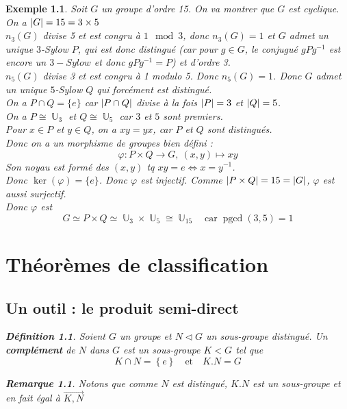 \documentclass[a4paper, oneside]{report}
\theoremstyle{break}
\newtheorem{definition}[thm]{Définition}
\newtheorem{exemple}[thm]{Exemple}
\newtheorem{remarque}[thm]{Remarque}
\newcommand{\mdg}{morphisme de groupes }
\newcommand{\x}{\times}
\DeclareMathOperator{\U}{\mathbb{U}}
\DeclarePairedDelimiter\ens{\left\{ }{\right\} }%
\DeclarePairedDelimiter\abs{\lvert}{\rvert}%
\DeclareMathOperator{\pgcd}{pgcd}
\renewcommand{\ens}[1]{\left\{ #1 \right\} }%
\newcommand{\slign}{\textbf}
\begin{document}
\begin{exemple}
Soit $G$ un groupe d'ordre 15. On va montrer que $G$ est cyclique.\\
On a $\abs{G} = 15 = 3 \times 5$\\
$n_3(G)$ divise 5 et est congru à $1 \mod 3$, donc $n_3(G) = 1$ et $G$ admet un unique $3$-Sylow $P$, qui est donc distingué (car pour $g\in G$, le conjugué $gPg^{-1}$ est encore un $3-Sylow$ et donc $gPg^{-1}= P$) et d'ordre 3.\\
$n_5(G)$ divise 3 et est congru à 1 modulo 5. Donc $n_5(G)=1$. Donc $G$ admet un unique $5$-Sylow $Q$ qui forcément est distingué.\\
On a $P\cap Q = \{e\}$ car $\abs{P\cap Q}$ divise à la fois $\abs{P}=3$ et $\abs{Q}=5$.\\
On a $P\cong \U_3$ et $Q\cong \U_5$ car $3$ et $5$ sont premiers.\\
Pour $x\in P$ et $y\in Q$, on a $xy=yx$, car $P$ et $Q$ sont distingués.\\
Donc on a un \mdg bien défini :
$$\varphi : P\x Q \rightarrow G,~(x,y)\mapsto xy$$
Son noyau est formé des $(x,y)$ tq $xy=e \Leftrightarrow x = y^{-1}$.\\
Donc $\ker (\varphi) = \{e\}$. Donc $\varphi$ est injectif. Comme $\abs{P\x Q}=15=\abs{G}$, $\varphi$ est aussi surjectif.\\
Donc $\varphi$ est
\[
G \simeq P \times Q \simeq \U_3 \times \U_5 \cong \U_{15}	\quad	\text{car} \; \pgcd(3, 5) = 1
\]

\chapter{Théorèmes de classification}

\section{Un outil : le produit semi-direct}

\begin{definition}
Soient $G$ un groupe et $N \triangleleft G$ un sous-groupe distingué. Un \slign{complément} de $N$ dans $G$ est un sous-groupe $K < G$ tel que
\[
K \cap N = \ens{e}		\quad	\text{et}	\quad	K.N = G
\]
\end{definition}

\begin{remarque}
Notons que comme $N$ est distingué, $K.N$ est un sous-groupe et en fait égal à $\vec{K, N}$
\end{remarque}


\end{exemple}
\end{document}
